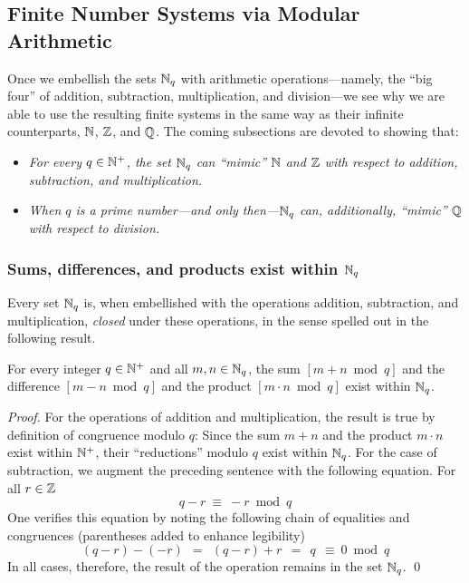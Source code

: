 \subsection{Finite Number Systems via Modular Arithmetic}
\label{sec:modular}

Once we embellish the sets $\mathbb{N}_q$ with arithmetic operations---namely, the ``big four'' of addition, subtraction, multiplication, and division---we see why we are able to use the resulting finite systems in the same way as their infinite counterparts, $\mathbb{N}$, $\mathbb{Z}$, and $\mathbb{Q}$.  The coming subsections are devoted to showing that:
\begin{itemize}
\item
{\em For every $q \in \mathbb{N}^+$, the set $\mathbb{N}_q$ can ``mimic'' $\mathbb{N}$ and $\mathbb{Z}$ with respect to addition, subtraction, and multiplication.}
\medskip\item
{\em When $q$ is a prime number---and only then---$\mathbb{N}_q$ can, additionally, ``mimic'' $\mathbb{Q}$ with respect to division.}
\end{itemize}

\subsubsection{Sums, differences, and products exist within $\mathbb{N}_q$}
\label{sec:modular-add-sub-mult}


Every set $\mathbb{N}_q$ is, when embellished with the operations addition, subtraction, and multiplication, {\em closed} under these operations, in the sense spelled out in the following result.

\begin{prop}
\label{thm:modular-add-sub-mult}
For every integer $q \in \mathbb{N}^+$ and all $m,n \in \mathbb{N}_q$, the sum $[m+n \bmod q]$ and the difference $[m-n \bmod q]$ and the product $[m \cdot n \bmod q]$ exist within $\mathbb{N}_q$.
\end{prop}

\begin{proof}
For the operations of addition and multiplication, the result is true by definition of congruence modulo $q$:  Since the sum $m+n$ and the product $m \cdot n$ exist within $\mathbb{N}^+$, their ``reductions'' modulo $q$ exist within $\mathbb{N}_q$.  For the case of subtraction, we augment the
preceding sentence with the following equation.  For all $r \in \mathbb{Z}$
\[ q-r \ \equiv \ -r \bmod q \]
One verifies this equation by noting the following chain of equalities and congruences (parentheses added to enhance legibility)
\[ (q-r) - (-r) \ \ = \ \ (q-r) + r \ \ = \ \ q \ \ \equiv \ 0 \bmod q \] 
In all cases, therefore, the result of the operation remains in the set $\mathbb{N}_q$.
\qed
\end{proof}

